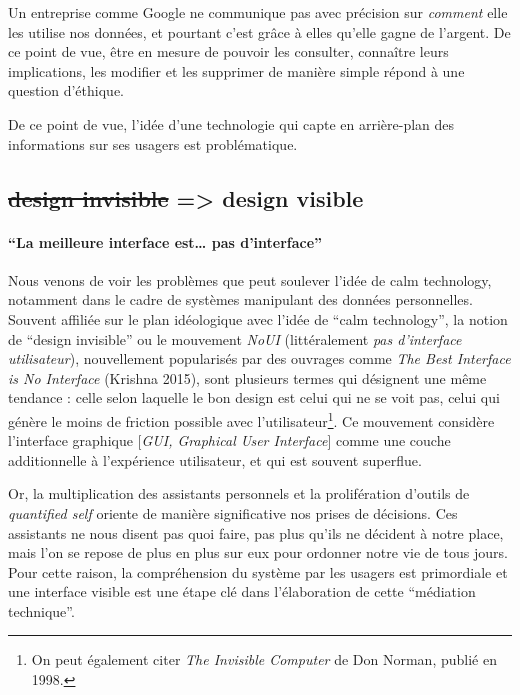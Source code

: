 \documentclass[]{article}
\let\oldparagraph\paragraph
\renewcommand{\paragraph}[1]{\oldparagraph{#1}\mbox{}}
\begin{document}
Un entreprise comme Google ne communique pas avec précision sur
\emph{comment} elle les utilise nos données, et pourtant c'est grâce à
elles qu'elle gagne de l'argent. De ce point de vue, être en mesure de
pouvoir les consulter, connaître leurs implications, les modifier et les
supprimer de manière simple répond à une question d'éthique.

De ce point de vue, l'idée d'une technologie qui capte en arrière-plan
des informations sur ses usagers est problématique.

\newpage

\hypertarget{design-invisible-design-visible}{%
\subsection{\texorpdfstring{\sout{design invisible} =\textgreater{}
design
visible}{design invisible =\textgreater{} design visible}}\label{design-invisible-design-visible}}

\hypertarget{la-meilleure-interface-est-pas-dinterface}{%
\paragraph{``La meilleure interface est\ldots{} pas
d'interface''}\label{la-meilleure-interface-est-pas-dinterface}}

Nous venons de voir les problèmes que peut soulever l'idée de calm
technology, notamment dans le cadre de systèmes manipulant des données
personnelles. Souvent affiliée sur le plan idéologique avec l'idée de
``calm technology'', la notion de ``design invisible'' ou le mouvement
\emph{NoUI} (littéralement \emph{pas d'interface utilisateur}),
nouvellement popularisés par des ouvrages comme \emph{The Best Interface
is No Interface} (Krishna 2015), sont plusieurs termes qui désignent une
même tendance : celle selon laquelle le bon design est celui qui ne se
voit pas, celui qui génère le moins de friction possible avec
l'utilisateur\footnote{On peut également citer \emph{The Invisible
  Computer} de Don Norman, publié en 1998.}. Ce mouvement considère
l'interface graphique {[}\emph{GUI, Graphical User Interface}{]} comme
une couche additionnelle à l'expérience utilisateur, et qui est souvent
superflue.

Or, la multiplication des assistants personnels et la prolifération
d'outils de \emph{quantified self} oriente de manière significative nos
prises de décisions. Ces assistants ne nous disent pas quoi faire, pas
plus qu'ils ne décident à notre place, mais l'on se repose de plus en
plus sur eux pour ordonner notre vie de tous jours. Pour cette raison,
la compréhension du système par les usagers est primordiale et une
interface visible est une étape clé dans l'élaboration de cette
``médiation technique''.
\end{document}
